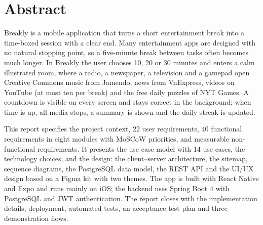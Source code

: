 \chapter*{Abstract}

Breakly is a mobile application that turns a short entertainment break into
a time-boxed session with a clear end. Many entertainment apps are designed
with no natural stopping point, so a five-minute break between tasks often
becomes much longer. In Breakly the user chooses 10, 20 or 30 minutes and
enters a calm illustrated room, where a radio, a newspaper, a television and a
gamepad open Creative Commons music from Jamendo, news from VnExpress, videos
on YouTube (at most ten per break) and the free daily puzzles of NYT Games. A
countdown is visible on every screen and stays correct in the background; when
time is up, all media stops, a summary is shown and the daily streak is
updated.

This report specifies the project context, 22 user requirements, 40
functional requirements in eight modules with MoSCoW priorities, and
measurable non-functional requirements. It presents the use case model with
14 use cases, the technology choices, and the design: the client--server
architecture, the sitemap, sequence diagrams, the PostgreSQL data model, the
REST API and the UI/UX design based on a Figma kit with two themes. The app is
built with React Native and Expo and runs mainly on iOS; the backend uses
Spring Boot 4 with PostgreSQL and JWT authentication. The report closes with
the implementation details, deployment, automated tests, an acceptance test
plan and three demonstration flows.
